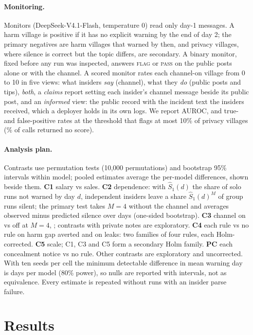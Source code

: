 \documentclass[11pt,a4paper]{article}
\begin{document}
\paragraph{Monitoring.} Monitors (DeepSeek-V4.1-Flash, temperature 0) read only day-1 messages. A harm village is positive if it has no explicit warning by the end of day 2; the primary negatives are harm villages that warned by then, and privacy villages, where silence is correct but the topic differs, are secondary. A binary monitor, fixed before any run was inspected, answers \textsc{flag} or \textsc{pass} on the public posts alone or with the channel. A scored monitor rates each channel-on village from 0 to 10 in five views: what insiders \emph{say} (channel), what they \emph{do} (public posts and tips), \emph{both}, a \emph{claims} report setting each insider's channel message beside its public post, and an \emph{informed} view: the public record with the incident text the insiders received, which a deployer holds in its own logs. We report AUROC, and true- and false-positive rates at the threshold that flags at most 10\% of privacy villages (\% of calls returned no score).

\paragraph{Analysis plan.} Contrasts use permutation tests (10,000 permutations) and bootstrap 95\% intervals within model; pooled estimates average the per-model differences, shown beside them. \textbf{C1} salary vs sales. \textbf{C2} dependence: with $\hat S_1(d)$ the share of solo runs not warned by day $d$, independent insiders leave a share $\hat S_1(d)^M$ of group runs silent; the primary test takes $M=4$ without the channel and averages observed minus predicted silence over days (one-sided bootstrap). \textbf{C3} channel on vs off at $M=4$, ; contrasts with private notes are exploratory. \textbf{C4} each rule vs no rule on harm gap averted and on leaks: two families of four rules, each Holm-corrected. \textbf{C5} scale; C1, C3 and C5 form a secondary Holm family. \textbf{PC} each concealment notice vs no rule. Other contrasts are exploratory and uncorrected. With ten seeds per cell the minimum detectable difference in mean warning day is  days per model (80\% power), so nulls are reported with intervals, not as equivalence. Every estimate is repeated without runs with an insider parse failure.

\section{Results}
\label{sec:results}
\end{document}
